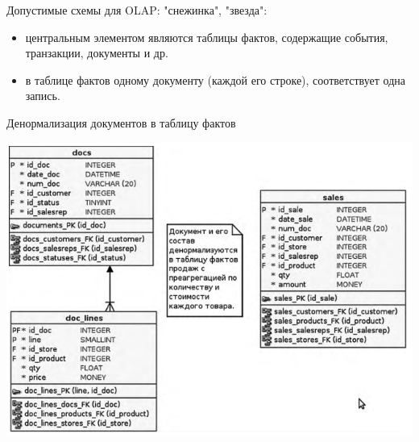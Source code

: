\begin{frame}
Допустимые схемы для OLAP: "снежинка", "звезда":
\begin{itemize}
\item центральным элементом являются таблицы фактов, содержащие события, транзакции, документы и др.
\item в таблице фактов одному документу (каждой его строке), соответствует одна запись.
\end{itemize}
\begin{block}{Денормализация документов в таблицу фактов}
\begin{center}
\includegraphics[scale=0.4]{images/denorm.png}
\end{center}
\end{block}
\end{frame}

